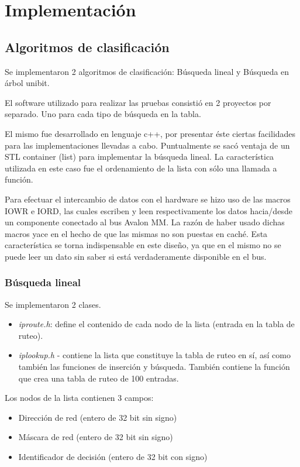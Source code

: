 \chapter{Implementación}

\section{Algoritmos de clasificación}

Se implementaron 2 algoritmos de clasificación: Búsqueda lineal y Búsqueda en árbol unibit.

El software utilizado para realizar las pruebas consistió en 2 proyectos por separado. Uno para cada tipo de búsqueda en la tabla.

El mismo fue desarrollado en lenguaje c++, por presentar éste ciertas facilidades para las implementaciones llevadas a cabo. Puntualmente se sacó ventaja de un STL container (list) para implementar la búsqueda lineal. La característica utilizada en este caso fue el ordenamiento de la lista con sólo una llamada a función.

Para efectuar el intercambio de datos con el hardware se hizo uso de las macros IOWR e IORD, las cuales escriben y leen respectivamente los datos hacia/desde un componente conectado al bus Avalon MM. La razón de haber usado dichas macros yace en el hecho de que las mismas no son puestas en caché. Esta característica se torna indispensable en este diseño, ya que en el mismo no se puede leer un dato sin saber si está verdaderamente disponible en el bus.


\subsection {Búsqueda lineal}

Se implementaron 2 clases. 

\begin{itemize}
	\item \textit{iproute.h}: define el contenido de cada nodo de la lista (entrada en la tabla de ruteo).
	\item \textit{iplookup.h} -  contiene la lista que constituye la tabla de ruteo en sí, así como también las funciones de inserción y búsqueda. También contiene la función que crea una tabla de ruteo de 100 entradas.
\end{itemize}

Los nodos de la lista contienen 3 campos:

\begin{itemize}
	\item Dirección de red (entero de 32 bit sin signo)
	\item Máscara de red (entero de 32 bit sin signo)
	\item Identificador de decisión (entero de 32 bit con signo)
\end{itemize}

